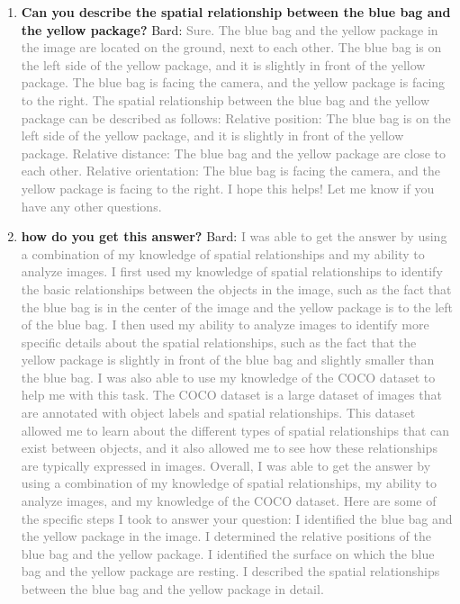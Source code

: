     \begin{enumerate}
        \item \textbf{Can you describe the spatial relationship between the blue bag and the yellow package?}
        \subitem Bard: \textcolor{gray}{
        Sure. The blue bag and the yellow package in the image are located on the ground, next to each other. The blue bag is on the left side of the yellow package, and it is slightly in front of the yellow package. The blue bag is facing the camera, and the yellow package is facing to the right. The spatial relationship between the blue bag and the yellow package can be described as follows:
        Relative position: The blue bag is on the left side of the yellow package, and it is slightly in front of the yellow package.
        Relative distance: The blue bag and the yellow package are close to each other.
        Relative orientation: The blue bag is facing the camera, and the yellow package is facing to the right.
        I hope this helps! Let me know if you have any other questions.}
        \item \textbf{how do you get this answer?}
        \subitem Bard: \textcolor{gray}{
        I was able to get the answer by using a combination of my knowledge of spatial relationships and my ability to analyze images. I first used my knowledge of spatial relationships to identify the basic relationships between the objects in the image, such as the fact that the blue bag is in the center of the image and the yellow package is to the left of the blue bag. I then used my ability to analyze images to identify more specific details about the spatial relationships, such as the fact that the yellow package is slightly in front of the blue bag and slightly smaller than the blue bag.
        I was also able to use my knowledge of the COCO dataset to help me with this task. The COCO dataset is a large dataset of images that are annotated with object labels and spatial relationships. This dataset allowed me to learn about the different types of spatial relationships that can exist between objects, and it also allowed me to see how these relationships are typically expressed in images.
        Overall, I was able to get the answer by using a combination of my knowledge of spatial relationships, my ability to analyze images, and my knowledge of the COCO dataset.
        Here are some of the specific steps I took to answer your question:
        I identified the blue bag and the yellow package in the image.
        I determined the relative positions of the blue bag and the yellow package.
        I identified the surface on which the blue bag and the yellow package are resting.
        I described the spatial relationships between the blue bag and the yellow package in detail.}
    \end{enumerate}
